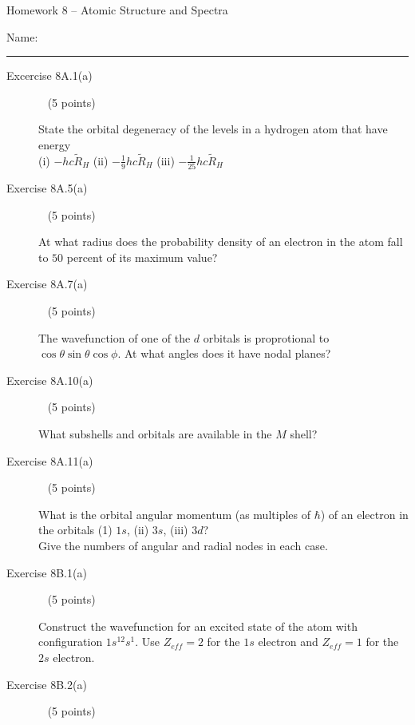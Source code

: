 \documentclass[10pt, letterpaper]{memoir}
\begin{document}
\begin{center}
	{\large Homework 8 -- Atomic Structure and Spectra}
\end{center}

Name: \rule[-.1mm]{15em}{0.1pt}

\begin{description}
	\item [Excercise 8A.1(a)] ~ (5 points)
	
	State the orbital degeneracy of the levels in a hydrogen atom that have energy \\(i) $-hc\tilde{R}_H$ (ii) $-\frac{1}{9}hc\tilde{R}_H$ (iii) $-\frac{1}{25}hc\tilde{R}_H$
	
	\vspace{8em}
	\item [Exercise 8A.5(a)] ~ (5 points)
	
	At what radius does the probability density of an electron in the  atom fall to $50$ percent of its maximum value?
	
	\vspace{14em}
	\item [Exercise 8A.7(a)] ~ (5 points)
	
	The wavefunction of one of the $d$ orbitals is proprotional to $\cos\theta\sin\theta\cos\phi$. At what angles does it have nodal planes?
	
	\vspace{12em}
	\item [Exercise 8A.10(a)] ~ (5 points)
	
	What subshells and orbitals are available in the $M$ shell?

	\vspace{10em}
	\item [Exercise 8A.11(a)] ~ (5 points)
	
	What is the orbital angular momentum (as multiples of $\hbar$) of an electron in the orbitals (1) $1s$, (ii) $3s$, (iii) $3d$? \\Give the numbers of angular and radial nodes in each case.
	
	\vspace{12em}
	\item [Exercise 8B.1(a)] ~ (5 points)
	
	Construct the wavefunction for an excited state of the  atom with configuration $1s^12s^1$. Use $Z_{eff}=2$ for the $1s$ electron and $Z_{eff}=1$ for the $2s$ electron.
	
	\vspace{8em}
	\item [Exercise 8B.2(a)] ~ (5 points)
	

\end{description}
\end{document}
